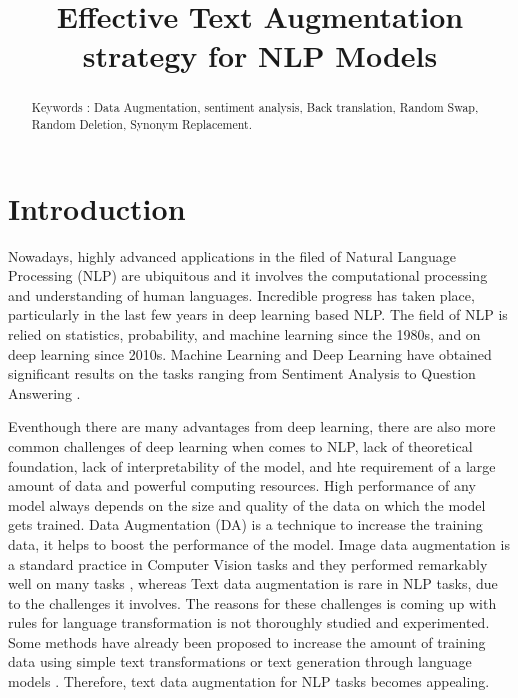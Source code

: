 \documentclass{article}
\title{Effective Text Augmentation strategy for NLP Models}
\begin{document}
\maketitle

\begin{abstract}


Keywords :  Data Augmentation, sentiment analysis, Back translation, Random Swap, Random Deletion, Synonym Replacement.


\end{abstract}

 

\section{Introduction}
Nowadays, highly advanced applications in the filed of Natural Language Processing (NLP) are ubiquitous and it involves the computational processing and understanding of human languages. Incredible progress has taken place, particularly in the last few years in deep learning based NLP. The field of NLP is relied on statistics, probability, and machine learning since the 1980s, and on deep learning since 2010s\cite{otter2020survey}.  Machine Learning and Deep Learning have obtained significant results on the tasks ranging from Sentiment Analysis \cite{tang2015deep} to Question Answering \cite{malinowski2017ask}. 

Eventhough there are many advantages from deep learning, there are also more common challenges of deep learning\cite{li2017deep} when comes to NLP, lack of theoretical foundation, lack of interpretability of the model, and hte requirement of a large amount of data and powerful computing resources. High performance of any model always depends on the size and quality of the data on which the model gets trained. Data Augmentation (DA) is a technique to increase the training data, it helps to boost the performance of the model. Image data augmentation is a standard practice in Computer Vision tasks and they performed remarkably well on many tasks \cite{perez2017effectiveness}, whereas Text data augmentation is rare in NLP tasks, due to the challenges it involves. The reasons for these challenges is coming up with rules for language transformation is not thoroughly studied and experimented. Some methods have already been proposed to increase the amount of training data using simple text transformations or text generation through language models \cite{abonizio2020pre}. Therefore, text data augmentation for NLP tasks becomes appealing.
\end{document}
